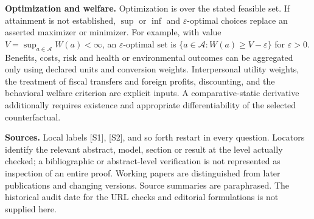 \documentclass[11pt,a4paper]{article}
\begin{document}
\textbf{Optimization and welfare.} Optimization is over the stated feasible set. If attainment is not established, $\sup$ or $\inf$ and $\varepsilon$-optimal choices replace an asserted maximizer or minimizer. For example, with value $V=\sup_{a\in\mathcal A}W(a)<\infty$, an $\varepsilon$-optimal set is $\{a\in\mathcal A:W(a)\geq V-\varepsilon\}$ for $\varepsilon>0$. Benefits, costs, risk and health or environmental outcomes can be aggregated only using declared units and conversion weights. Interpersonal utility weights, the treatment of fiscal transfers and foreign profits, discounting, and the behavioral welfare criterion are explicit inputs. A comparative-static derivative additionally requires existence and appropriate differentiability of the selected counterfactual.

\textbf{Sources.} Local labels [S1], [S2], and so forth restart in every question. Locators identify the relevant abstract, model, section or result at the level actually checked; a bibliographic or abstract-level verification is not represented as inspection of an entire proof. Working papers are distinguished from later publications and changing versions. Source summaries are paraphrased. The historical audit date for the URL checks and editorial formulations is not supplied here.
\end{document}
